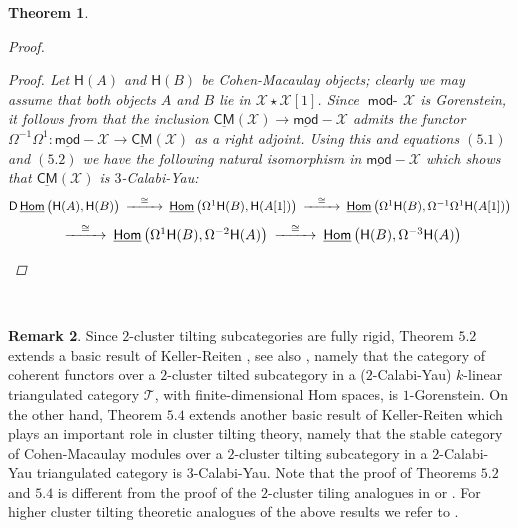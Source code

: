 \documentclass[oneside, a4paper,reqno]{amsart}
\numberwithin{equation}{section}
\newtheorem{thm}{Theorem}[section]
\theoremstyle{definition}
\newtheorem{rem}[thm]{Remark}
\begin{document}
\begin{thm}
\begin{proof}
\begin{enumerate}
{\em Proof.} Let $\mathsf{H}(A)$ and $\mathsf{H}(B)$ be Cohen-Macaulay objects; clearly we may assume that both objects $A$ and $B$ lie in ${\mathcal X}\star{\mathcal X}[1]$. Since $\operatorname*{\mathsf{mod}-\!}{\mathcal X}$ is Gorenstein, it follows from \cite{B:cm} that the inclusion $\underline{\mathsf{CM}}({\mathcal X}) {\longrightarrow} \operatorname*{\underline{\mathsf{mod}}-\!}{\mathcal X}$ admits the functor $\Omega^{-1}\Omega^{1} \colon \operatorname*{\underline{\mathsf{mod}}-\!}{\mathcal X} {\longrightarrow} \underline{\mathsf{CM}}({\mathcal X})$ as a right adjoint. Using this and equations $(5.1)$ and $(5.2)$ we have  the following natural isomorphism in $\operatorname*{\underline{\mathsf{mod}}-\!}{\mathcal X}$ which shows that $\underline{\mathsf{CM}}({\mathcal X})$ is $3$-Calabi-Yau: 
\[
\begin{CD}
\mathsf{D}\operatorname*{\underline{\mathsf{Hom}}}\big(\mathsf{H}(A),\mathsf{H}(B)\big)  @> \cong >> \operatorname*{\underline{\mathsf{Hom}}}\big(\Omega^{1}\mathsf{H}(B),\mathsf{H}(A[1])\big) @> \cong >>  \operatorname*{\underline{\mathsf{Hom}}}\big(\Omega^{1}\mathsf{H}(B),\Omega^{-1}\Omega^{1}\mathsf{H}(A[1])\big)  
\end{CD}
\]
\[
\begin{CD}
@> \cong >> \operatorname*{\underline{\mathsf{Hom}}}\big(\Omega^{1}\mathsf{H}(B),\Omega^{-2}\mathsf{H}(A)\big) @> \cong >>  \operatorname*{\underline{\mathsf{Hom}}}\big(\mathsf{H}(B),\Omega^{-3}\mathsf{H}(A)\big) 
\end{CD} \qedhere 
\]
\end{enumerate}
\end{proof}  
\end{thm}

\,

\begin{rem} Since $2$-cluster tilting subcategories are fully rigid, Theorem $5.2$ extends a basic result of Keller-Reiten \cite[Proposition $2.1$]{KR1}, see also \cite[Theorem $4.3$]{KZ}, namely that the category of coherent functors over a $2$-cluster tilted subcategory in a ($2$-Calabi-Yau) $k$-linear triangulated category ${\mathcal T}$, with finite-dimensional Hom spaces, is $1$-Gorenstein.   On the other hand, Theorem $5.4$ extends another basic result of Keller-Reiten \cite[Theorem $3.3$]{KR1} which plays an important role in cluster tilting theory, namely  that the stable category of  Cohen-Macaulay modules over  a $2$-cluster tilting subcategory in a $2$-Calabi-Yau triangulated category is $3$-Calabi-Yau. Note that the proof of Theorems $5.2$ and $5.4$ is different from the proof of the $2$-cluster tiling analogues in \cite{KR1} or \cite{KZ}.  For higher cluster tilting theoretic analogues of the above results we refer to \cite{B}.   
\end{rem} 
\end{document}
